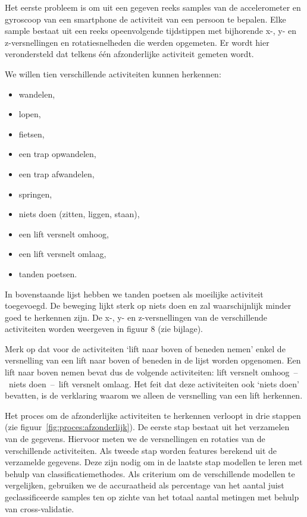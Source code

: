 \documentclass{article}
\begin{document}
Het eerste probleem is om uit een gegeven reeks samples van de accelerometer en gyroscoop van een smartphone de activiteit van een persoon te bepalen. Elke sample bestaat uit een reeks opeenvolgende tijdstippen met bijhorende x-, y- en z-versnellingen en rotatiesnelheden die werden opgemeten. Er wordt hier verondersteld dat telkens \'e\'en afzonderlijke activiteit gemeten wordt.

We willen tien verschillende activiteiten kunnen herkennen:
\begin{itemize}
\item wandelen,
\item lopen,
\item fietsen,
\item een trap opwandelen,
\item een trap afwandelen,
\item springen,
\item niets doen (zitten, liggen, staan),
\item een lift versnelt omhoog,
\item een lift versnelt omlaag,
\item tanden poetsen.
\end{itemize}

In bovenstaande lijst hebben we tanden poetsen als moeilijke activiteit toegevoegd. De beweging lijkt sterk op niets doen en zal waarschijnlijk minder goed te herkennen zijn. De x-, y- en z-versnellingen van de verschillende activiteiten worden weergeven in figuur 8 (zie bijlage).

Merk op dat voor de activiteiten `lift naar boven of beneden nemen' enkel de versnelling van een lift naar boven of beneden in de lijst worden opgenomen. Een lift naar boven nemen bevat dus de volgende activiteiten: lift versnelt omhoog~--~niets doen~--~lift versnelt omlaag. Het feit dat deze activiteiten ook `niets doen' bevatten, is de verklaring waarom we alleen de versnelling van een lift herkennen.

Het proces om de afzonderlijke activiteiten te herkennen verloopt in drie stappen (zie figuur~\ref{fig:proces:afzonderlijk}). De eerste stap bestaat uit het verzamelen van de gegevens. Hiervoor meten we de versnellingen en rotaties van de verschillende activiteiten. Als tweede stap worden features berekend uit de verzamelde gegevens. Deze zijn nodig om in de laatste stap modellen te leren met behulp van classificatiemethodes. Als criterium om de verschillende modellen te vergelijken, gebruiken we de accuraatheid als percentage van het aantal juist geclassificeerde samples ten op zichte van het totaal aantal metingen met behulp van cross-validatie.
\end{document}

